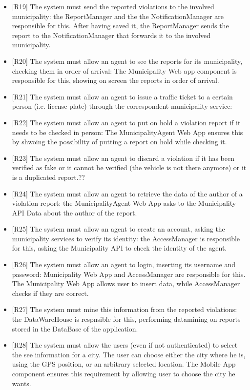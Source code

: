 \documentclass[a4paper]{report}
\begin{document}
\begin{itemize}
\item {[R19]}	\label{R19}The system must send the reported violations to the involved municipality: the ReportManager and the the NotificationManager are responsible for this. After having saved it, the ReportManager sends the report to the NotificationManager that forwards it to the involved municipality.
\item {[R20]}   \label{R20}The system must allow an agent to see the reports for its municipality, checking them in order of arrival: The Municipality Web app component is responsible for this, showing on screen the reports in order of arrival.
\item {[R21]}	\label{R21}The system must allow an agent to issue a traffic ticket to a certain person (i.e. license plate) through the correspondent municipality service:
\item {[R22]}	\label{R22}The system must allow an agent to put on hold a violation report if it needs to be checked in person: The MunicipalityAgent Web App ensures this by shwoing the possibility of putting a report on hold while checking it.
\item {[R23]}	\label{R23}The system must allow an agent to discard a violation if it has been verified as fake or it cannot be verified (the vehicle is not there anymore) or it is a duplicated report.??
\item {[R24]}	\label{R24}The system must allow an agent to retrieve the data of the author of a violation report: the MunicipalityAgent Web App asks to the Municipality API Data about the author of the report. 
\item {[R25]}	\label{R25}The system must allow an agent to create an account, asking the municipality services to verify its identity: the AccessManager is responsible for this, asking the Municipality API to check the identity of the agent.
\item {[R26]}	\label{R26}The system must allow an agent to login, inserting its username and password: Municipality Web App and AccessManager are responsible for this. The Municipality Web App allows user to insert data, while AccessManager checks if they are correct.
\item {[R27]}	\label{R27}The system must mine this information from the reported violations: the DataWareHouse is respnsible for this, performing datamining on reports stored in the DataBase of the application.
\item {[R28]}	\label{R28}The system must allow the users (even if not authenticated) to select the see information for a city. The user can choose either the city where he is, using the GPS position, or an arbitrary selected location. The Mobile App component ensures this requirement by allowing user to choose the city he wants.

\end{itemize}
\end{document}
